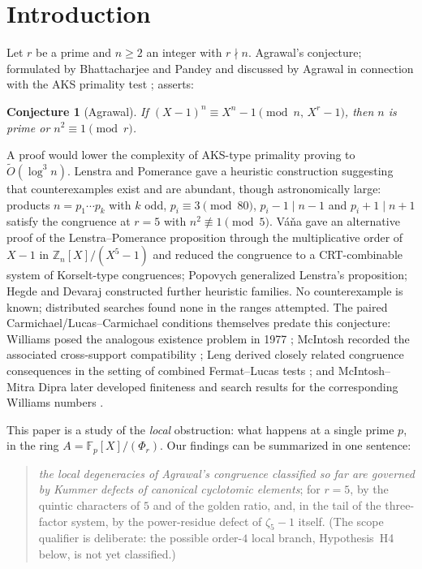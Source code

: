 \documentclass[11pt]{amsart}
\newtheorem{conjecture}[theorem]{Conjecture}
\theoremstyle{definition}
\theoremstyle{remark}
\newcommand{\F}{\mathbb{F}}
\newcommand{\Z}{\mathbb{Z}}
\begin{document}
\maketitle

\section{Introduction}

Let $r$ be a prime and $n \ge 2$ an integer with $r \nmid n$. Agrawal's
conjecture; formulated by Bhattacharjee and Pandey \cite{BP2001} and
discussed by Agrawal in connection with the AKS primality test
\cite{AKS2004}; asserts:
\begin{conjecture}[Agrawal]\label{conj:agrawal}
If $(X-1)^n \equiv X^n - 1 \pmod{n,\, X^r-1}$, then $n$ is prime or
$n^2 \equiv 1 \pmod r$.
\end{conjecture}
A proof would lower the complexity of AKS-type primality proving to
$\widetilde{O}(\log^3 n)$. Lenstra and Pomerance \cite{LP} gave a heuristic
construction suggesting that counterexamples exist and are abundant, though
astronomically large: products $n = p_1\cdots p_k$ with $k$ odd,
$p_i \equiv 3 \pmod{80}$, $p_i - 1 \mid n-1$ and $p_i+1 \mid n+1$ satisfy the
congruence at $r=5$ with $n^2 \not\equiv 1 \pmod 5$. V\'a\v na \cite{Vana2009}
gave an alternative proof of the Lenstra--Pomerance proposition through the
multiplicative order of $X-1$ in $\Z_n[X]/(X^5-1)$ and reduced the congruence
to a CRT-combinable system of Korselt-type congruences; Popovych
\cite{Popovych2009} generalized Lenstra's proposition; Hegde and Devaraj
\cite{HD2021} constructed further heuristic families. No counterexample is
known; distributed searches found none in the ranges attempted.
The paired Carmichael/Lucas--Carmichael conditions themselves predate this
conjecture: Williams posed the analogous existence problem in 1977
\cite{Williams1977}; McIntosh recorded the associated cross-support
compatibility \cite{McIntosh2014}; Leng derived closely related congruence
consequences in the setting of combined Fermat--Lucas tests \cite{Leng2017};
and McIntosh--Mitra Dipra later developed finiteness and search results for
the corresponding Williams numbers \cite{McIntoshDipra2015}.

This paper is a study of the \emph{local} obstruction: what happens at a
single prime $p$, in the ring $A = \F_p[X]/(\Phi_r)$. Our findings can be
summarized in one sentence:
\begin{quote}
\emph{the local degeneracies of Agrawal's congruence classified so far are
governed by Kummer defects of canonical cyclotomic elements}; for
$r = 5$, by the quintic characters of $5$ and of the golden ratio, and, in
the tail of the three-factor system, by the power-residue defect of
$\zeta_5 - 1$ itself. (The scope qualifier is deliberate: the possible
order-$4$ local branch, Hypothesis~H4 below, is not yet classified.)
\end{quote}
\end{document}
